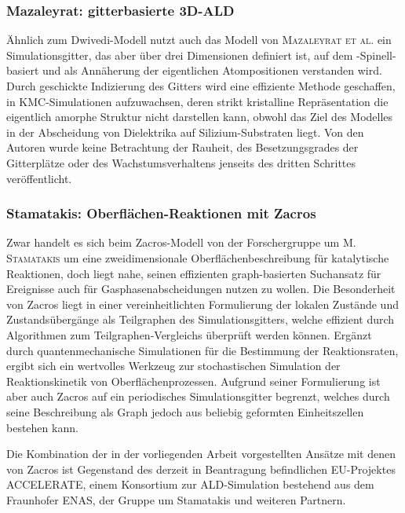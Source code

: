 \subsubsection{Mazaleyrat: gitterbasierte 3D-ALD}

Ähnlich zum Dwivedi-Modell nutzt auch das Modell von \textsc{Mazaleyrat et al.}\cite{mazaleyrat_methodology_2005} ein Simulationsgitter, das aber über drei Dimensionen definiert ist, auf dem -Spinell-basiert und als Annäherung der eigentlichen Atompositionen verstanden wird.
Durch geschickte Indizierung des Gitters wird eine effiziente Methode geschaffen,  in KMC-Simulationen aufzuwachsen, deren strikt kristalline Repräsentation die eigentlich amorphe Struktur nicht darstellen kann, obwohl das Ziel des Modelles in der Abscheidung von Dielektrika auf Silizium-Substraten liegt.
Von den Autoren wurde keine Betrachtung der Rauheit, des Besetzungsgrades der Gitterplätze oder des Wachstumsverhaltens jenseits des dritten Schrittes veröffentlicht.

\subsubsection{Stamatakis: Oberflächen-Reaktionen mit Zacros}

Zwar handelt es sich beim Zacros-Modell von der Forschergruppe um \textsc{M. Stamatakis}\cite{stamatakis_graph-theoretical_2011,nielsen_parallel_2013,stamatakis_zacros_2014} um eine zweidimensionale Oberflächenbeschreibung für katalytische Reaktionen, doch liegt nahe, seinen effizienten graph-basierten Suchansatz für Ereignisse auch für Gasphasenabscheidungen nutzen zu wollen.
Die Besonderheit von Zacros liegt in einer vereinheitlichten Formulierung der lokalen Zustände und Zustandsübergänge als Teilgraphen des Simulationsgitters, welche effizient durch Algorithmen zum Teilgraphen-Vergleichs überprüft werden können.
Ergänzt durch quantenmechanische Simulationen für die Bestimmung der Reaktionsraten, ergibt sich ein wertvolles Werkzeug zur stochastischen Simulation der Reaktionskinetik von Oberflächenprozessen.
Aufgrund seiner Formulierung ist aber auch Zacros auf ein periodisches Simulationsgitter begrenzt, welches durch seine Beschreibung als Graph jedoch aus beliebig geformten Einheitszellen bestehen kann.

Die Kombination der in der vorliegenden Arbeit vorgestellten Ansätze mit denen von Zacros ist Gegenstand des derzeit in Beantragung befindlichen EU-Projektes ACCELERATE, einem Konsortium zur ALD-Simulation bestehend aus dem Fraunhofer ENAS, der Gruppe um Stamatakis und weiteren Partnern.

